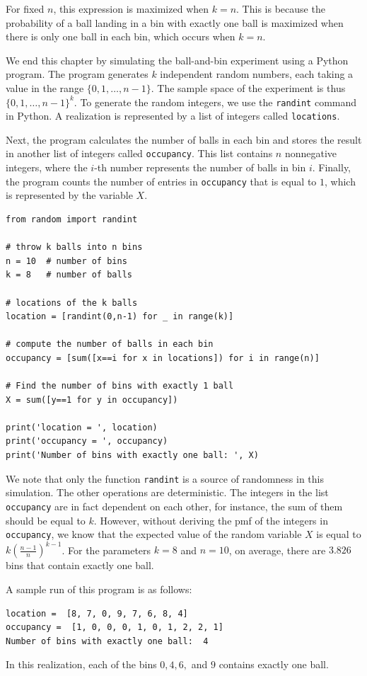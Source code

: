 For fixed $n$, this expression is maximized when $k=n$. This is because the probability of a ball landing in a bin with exactly one ball is maximized when there is only one ball in each bin, which occurs when $k=n$.

We end this chapter by simulating the ball-and-bin experiment using a Python program. The program generates $k$ independent random numbers, each taking a value in the range $\{0,1,\dots,n-1\}$. The sample space of the experiment is thus $\{0,1,\dots,n-1\}^k$. To generate the random integers, we use the \texttt{randint} command in Python. A realization is represented by a list of integers called \texttt{locations}.

Next, the program calculates the number of balls in each bin and stores the result in another list of integers called \texttt{occupancy}. This list contains $n$ nonnegative integers, where the $i$-th number represents the number of balls in bin $i$. Finally, the program counts the number of entries in \texttt{occupancy} that is equal to $1$, which is represented by the variable $X$.

\begin{verbatim}
from random import randint

# throw k balls into n bins
n = 10  # number of bins
k = 8   # number of balls

# locations of the k balls
location = [randint(0,n-1) for _ in range(k)]

# compute the number of balls in each bin
occupancy = [sum([x==i for x in locations]) for i in range(n)]

# Find the number of bins with exactly 1 ball
X = sum([y==1 for y in occupancy])

print('location = ', location)
print('occupancy = ', occupancy)
print('Number of bins with exactly one ball: ', X)
\end{verbatim}

We note that only the function \texttt{randint} is a source of randomness in this simulation. The other operations are deterministic. The integers in the list \texttt{occupancy} are in fact dependent on each other, for instance, the sum of them should be equal to $k$. However, without deriving the pmf of the integers in \texttt{occupancy}, we know that the expected value of the random variable $X$ is equal to $k\left(\frac{n-1}{n}\right)^{k-1}$. For the parameters $k=8$ and $n=10$, on average, there are $3.826$ bins that contain exactly one ball.

A sample run of this program is as follows:
\begin{verbatim}
location =  [8, 7, 0, 9, 7, 6, 8, 4]
occupancy =  [1, 0, 0, 0, 1, 0, 1, 2, 2, 1]
Number of bins with exactly one ball:  4
\end{verbatim}

In this realization, each of the bins $0,4,6,$ and $9$ contains exactly one ball.
